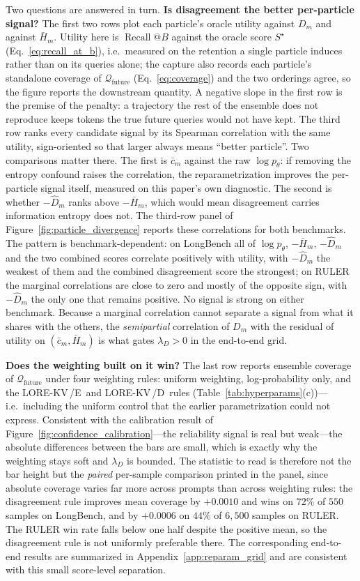 \documentclass{article} %
\newcommand{\lorekvE}{LORE-KV\,/E}
\newcommand{\lorekvD}{LORE-KV\,/D}
\begin{document}
Two questions are answered in turn. \textbf{Is disagreement the better per-particle signal?} The first two rows plot each particle's oracle utility against $D_m$ and against $\bar H_m$. Utility here is $\operatorname{Recall}@B$ against the oracle score $S^\star$ (Eq.~\ref{eq:recall_at_b}), i.e.\ measured on the retention a single particle induces rather than on its queries alone; the capture also records each particle's standalone coverage of $\mathcal{Q}_{\mathrm{future}}$ (Eq.~\ref{eq:coverage}) and the two orderings agree, so the figure reports the downstream quantity. A negative slope in the first row is the premise of the penalty: a trajectory the rest of the ensemble does not reproduce keeps tokens the true future queries would not have kept. The third row ranks every candidate signal by its Spearman correlation with the same utility, sign-oriented so that larger always means ``better particle''. Two comparisons matter there. The first is $\bar c_m$ against the raw $\log p_\theta$: if removing the entropy confound raises the correlation, the reparametrization improves the per-particle signal itself, measured on this paper's own diagnostic. The second is whether $-\hat D_m$ ranks above $-\bar H_m$, which would mean disagreement carries information entropy does not. The third-row panel of Figure~\ref{fig:particle_divergence} reports these correlations for both benchmarks. The pattern is benchmark-dependent: on LongBench all of $\log p_\theta$, $-\bar H_m$, $-\hat D_m$ and the two combined scores correlate positively with utility, with $-\hat D_m$ the weakest of them and the combined disagreement score the strongest; on RULER the marginal correlations are close to zero and mostly of the opposite sign, with $-\hat D_m$ the only one that remains positive. No signal is strong on either benchmark. Because a marginal correlation cannot separate a signal from what it shares with the others, the \emph{semipartial} correlation of $D_m$ with the residual of utility on $(\bar c_m,\bar H_m)$ is what gates $\lambda_D>0$ in the end-to-end grid.

\textbf{Does the weighting built on it win?} The last row reports ensemble coverage of $\mathcal{Q}_{\mathrm{future}}$ under four weighting rules: uniform weighting, log-probability only, and the \lorekvE\ and \lorekvD\ rules (Table~\ref{tab:hyperparams}(c))---i.e.\ including the uniform control that the earlier parametrization could not express. Consistent with the calibration result of Figure~\ref{fig:confidence_calibration}---the reliability signal is real but weak---the absolute differences between the bars are small, which is exactly why the weighting stays soft and $\lambda_D$ is bounded. The statistic to read is therefore not the bar height but the \emph{paired} per-sample comparison printed in the panel, since absolute coverage varies far more across prompts than across weighting rules: the disagreement rule improves mean coverage by $+0.0010$ and wins on $72\%$ of $550$ samples on LongBench, and by $+0.0006$ on $44\%$ of $6{,}500$ samples on RULER. The RULER win rate falls below one half despite the positive mean, so the disagreement rule is not uniformly preferable there. The corresponding end-to-end results are summarized in Appendix~\ref{app:reparam_grid} and are consistent with this small score-level separation.
\end{document}
